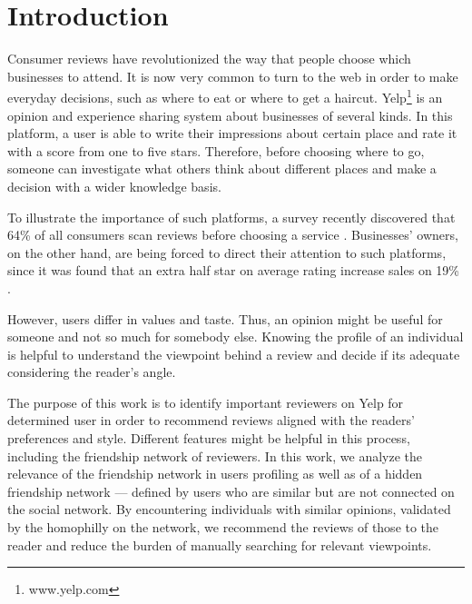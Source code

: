 \section{Introduction}
Consumer reviews have revolutionized the way that people choose which businesses
to attend. It is now very common to turn to the web in order to make everyday
decisions, such as where to eat or where to get a haircut.
Yelp\footnote{www.yelp.com} is an opinion and experience sharing system about
businesses of several kinds. In this platform, a user is able to write their
impressions about certain place and rate it with a score from one to five stars.
Therefore, before choosing where to go, someone can investigate what others
think about different places and make a decision with a wider knowledge basis.

To illustrate the importance of such platforms, a survey recently discovered
that 64\% of all consumers scan reviews before choosing a service \cite{survey}.
Businesses' owners, on the other hand, are being forced to direct their
attention to such platforms, since it was found that an extra half star on
average rating increase sales on 19\% \cite{study}.

However, users differ in values and taste. Thus, an opinion might be useful for
someone and not so much for somebody else. Knowing the profile of an individual
is helpful to understand the viewpoint behind a review and decide if its
adequate considering the reader's angle.

The purpose of this work is to identify important reviewers on Yelp for
determined user in order to recommend reviews aligned with the readers'
preferences and style. Different features might be helpful in this process,
including the friendship network of reviewers. In this work, we analyze the
relevance of the friendship network in users profiling as well as of a hidden
friendship network --- defined by users who are similar but are not connected on
the social network. By encountering individuals with similar opinions, validated
by the homophilly on the network, we recommend the reviews of those to the
reader and reduce the burden of manually searching for relevant viewpoints.
